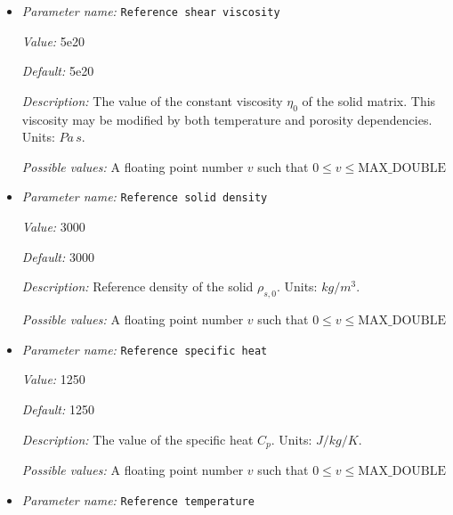 \begin{itemize}
{\it Description:} Reference permeability of the solid host rock.Units: $m^2$.


{\it Possible values:} A floating point number $v$ such that $-\text{MAX\_DOUBLE} \leq v \leq \text{MAX\_DOUBLE}$
\item {\it Parameter name:} {\tt Reference shear viscosity}
\label{parameters:Material model/Melt global/Reference shear viscosity}
\label{parameters:Material_20model/Melt_20global/Reference_20shear_20viscosity}


{\it Value:} 5e20


{\it Default:} 5e20


{\it Description:} The value of the constant viscosity $\eta_0$ of the solid matrix. This viscosity may be modified by both temperature and porosity dependencies. Units: $Pa \, s$.


{\it Possible values:} A floating point number $v$ such that $0 \leq v \leq \text{MAX\_DOUBLE}$
\item {\it Parameter name:} {\tt Reference solid density}
\label{parameters:Material model/Melt global/Reference solid density}
\label{parameters:Material_20model/Melt_20global/Reference_20solid_20density}


{\it Value:} 3000


{\it Default:} 3000


{\it Description:} Reference density of the solid $\rho_{s,0}$. Units: $kg/m^3$.


{\it Possible values:} A floating point number $v$ such that $0 \leq v \leq \text{MAX\_DOUBLE}$
\item {\it Parameter name:} {\tt Reference specific heat}
\label{parameters:Material model/Melt global/Reference specific heat}
\label{parameters:Material_20model/Melt_20global/Reference_20specific_20heat}


{\it Value:} 1250


{\it Default:} 1250


{\it Description:} The value of the specific heat $C_p$. Units: $J/kg/K$.


{\it Possible values:} A floating point number $v$ such that $0 \leq v \leq \text{MAX\_DOUBLE}$
\item {\it Parameter name:} {\tt Reference temperature}
\label{parameters:Material model/Melt global/Reference temperature}
\label{parameters:Material_20model/Melt_20global/Reference_20temperature}



\end{itemize}
